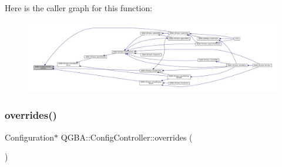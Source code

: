Here is the caller graph for this function\+:
\nopagebreak
\begin{figure}[H]
\begin{center}
\leavevmode
\includegraphics[width=350pt]{class_q_g_b_a_1_1_config_controller_a5935ec3402096eb3a4629a72a9872b03_icgraph}
\end{center}
\end{figure}
\mbox{\label{class_q_g_b_a_1_1_config_controller_a3a1e6f7263f15d8cfc4af1f1793b0aac}} 
\subsubsection{\texorpdfstring{overrides()}{overrides()}}
{\footnotesize\ttfamily Configuration$\ast$ Q\+G\+B\+A\+::\+Config\+Controller\+::overrides (\begin{DoxyParamCaption}{ }\end{DoxyParamCaption})\hspace{0.3cm}{\ttfamily [inline]}}

